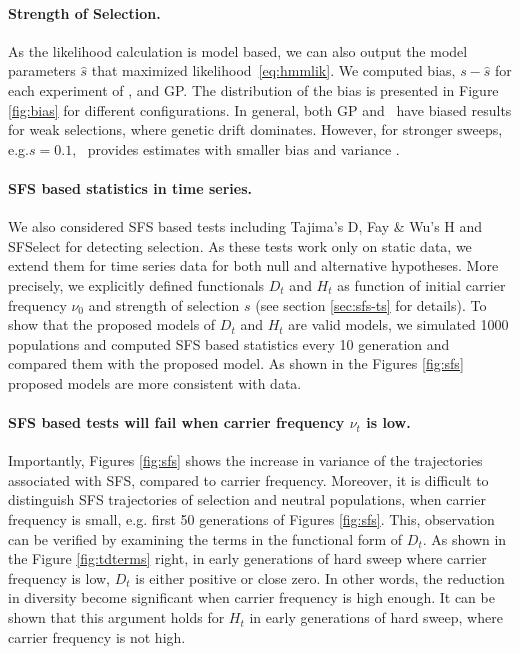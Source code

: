 \documentclass[11pt]{article}
\def\comale{\text{{\sc Comale}}}
\begin{document}
\paragraph{Strength of Selection.}
As the likelihood calculation is model based, we can also output the
model parameters $\hat{s}$ that maximized
likelihood~\eqref{eq:hmmlik}. We computed bias, $s-\hat{s}$ for each
experiment of \comale, and GP. The distribution of the bias is
presented in Figure \ref{fig:bias} for different configurations. In
general, both GP and \comale\ have biased results for weak selections,
where genetic drift dominates. However, for stronger sweeps,
e.g.$s=0.1$, \comale\ provides estimates with smaller bias and
variance .


\paragraph{SFS based statistics in time series.} 
We also considered SFS based tests including Tajima's D, Fay \& Wu's H and 
SFSelect for detecting selection. 
As these tests work only on static data, we extend them for time series data 
for both null and alternative hypotheses.
More precisely, we explicitly defined functionals $D_t$ and $H_t$ as function 
of initial carrier frequency $\nu_0$ and strength of selection $s$ (see section 
\ref{sec:sfs-ts} for details).
 To show that the proposed models of $D_t$ and $H_t$ are valid models, we 
 simulated 1000 populations and computed SFS based statistics every 10 
 generation and compared them with the proposed model.
 As shown in the Figures \ref{fig:sfs} proposed models are more consistent with data.

 \paragraph{SFS based tests will fail when carrier frequency $\nu_t$
   is low.} 
 Importantly, Figures \ref{fig:sfs} shows the increase in variance of
 the trajectories associated with SFS, compared to carrier
 frequency. Moreover, it is difficult to distinguish SFS trajectories
 of selection and neutral populations, when carrier frequency is
 small, e.g. first 50 generations of Figures \ref{fig:sfs}.  This,
 observation can be verified by examining the terms in the functional
 form of $D_t$.  As shown in the Figure \ref{fig:tdterms} right, in
 early generations of hard sweep where carrier frequency is low, $D_t$
 is either positive or close zero. In other words, the reduction in
 diversity become significant when carrier frequency is high enough.
 It can be shown that this argument holds for $H_t$ in early
 generations of hard sweep, where carrier frequency is not high.
\end{document}

